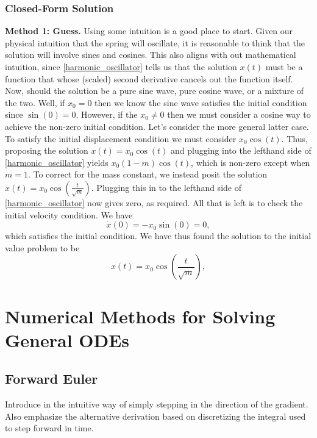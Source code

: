 \documentclass[12pt]{article}
\newcommand{\state}{x}
\begin{document}
\subsubsection{Closed-Form Solution}

\textbf{Method 1: Guess.} Using some intuition is a good place to start. Given our physical intuition that the spring will oscillate, it is reasonable to think that the solution
will involve sines and cosines. This also aligns with out mathematical intuition, since \ref{harmonic_oscillator} tells us that the solution $\state(t)$ must be a function that 
whose (scaled) second derivative cancels out the function itself. Now, should the solution be a pure sine wave, pure cosine wave, or a mixture of the two. Well, if 
$\state_0 = 0$ then we know the sine wave satisfies the initial condition since $\sin(0) = 0$. However, if the $\state_0 \neq 0$ then we must consider a cosine way to 
achieve the non-zero initial condition.
 Let's consider the more general latter case. To satisfy the initial displacement condition we must consider $\state_0 \cos(t)$.
 Thus, proposing the solution $\state(t) = \state_0 \cos(t)$ and plugging into the lefthand side of 
\ref{harmonic_oscillator} yields $\state_0 (1 - m)\cos(t)$, which is non-zero except when $m = 1$. To correct for the mass constant, we instead posit the solution 
$\state(t) = \state_0 \cos\left(\frac{t}{\sqrt{m}}\right)$. Plugging this in to the lefthand side of \ref{harmonic_oscillator} now gives zero, as required. All that is left is to 
check the initial velocity condition. We have 
\[
\dot{\state}(0) = - \state_0 \sin\left(0\right) = 0, 
\]
which satisfies the initial condition. We have thus found the solution to the initial value problem to be
\[
\state(t) = \state_0 \cos\left(\frac{t}{\sqrt{m}}\right),
\]



\section{Numerical Methods for Solving General ODEs}

\subsection{Forward Euler}
Introduce in the intuitive way of simply stepping in the direction of the gradient. Also emphasize the alternative derivation based on discretizing the integral used to 
step forward in time. 
\end{document}
